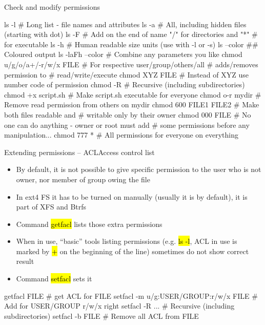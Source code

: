 \documentclass[compress, ucs, xelatex, 11pt, xcolor=svgnames,
  hyperref={
    bookmarks=true,
    unicode=true,
    colorlinks=true,
    pdftitle={Linux, command line and MetaCentrum},
    plainpages=false,
    pdfauthor={Vojtech Zeisek},
    pdfsubject={Course about use of Linux command line, writing shell scripts and using MetaCentrum of CESNET},
    pdfcreator={XeLaTeX},
    pdfkeywords={Linux, GNU, BASH, shell, command line, MetaCentrum},
    linkcolor=Red,
    anchorcolor=Blue,
    citecolor=Purple,
    filecolor=DodgerBlue,
    menucolor=DarkOrchid,
    urlcolor=DeepSkyBlue,
    pdftex},
  url={hyphens, lowtilde} %
  ]{beamer}
\renewcommand{\texttt}[1]{\hl{\ttfamily #1}}
\begin{document}
\begin{frame}[fragile]{Check and modify permissions}
  \begin{bashcode}
    ls -l # Long list - file names and attributes
    ls -a # All, including hidden files (starting with dot)
    ls -F # Add on the end of name "/" for directories and "*"
          # for executable
    ls -h # Human readable size units (use with -l or -s)
    ls --color ## Coloured output
    ls -laFh --color # Combine any parameters you like
    chmod u/g/o/a+/-r/w/x FILE # For respective user/group/others/all
                               # adds/removes permission to
                               # read/write/execute
    chmod XYZ FILE # Instead of XYZ use number code of permission
    chmod -R # Recursive (including subdirectories)
    chmod +x script.sh # Make script.sh executable for everyone
    chmod o-r mydir # Remove read permission from others on mydir
    chmod 600 FILE1 FILE2 # Make both files readable and
                          # writable only by their owner
    chmod 000 FILE # No one can do anything - owner or root must add
                   # some permissions before any manipulation...
    chmod 777 * # All permissions for everyone on everything
  \end{bashcode}
\end{frame}

\begin{frame}[fragile, label=acl]{Extending permissions -- ACL}{Access control list}
\begin{itemize}
  \item By default, it is not possible to give specific permission to the user who is not owner, nor member of group owing the file
  \item In ext4 FS it has to be turned on manually (usually it is by default), it is part of XFS and Btrfs
  \item Command \texttt{getfacl} lists those extra permissions
  \item When in use, ``basic'' tools listing permissions (e.g. \texttt{ls -l}, ACL in use is marked by \texttt{+} on the beginning of the line) sometimes do not show correct result
  \item Command \texttt{setfacl} sets it
\end{itemize}
  \begin{bashcode}
    getfacl FILE # get ACL for FILE
    setfacl -m u/g:USER/GROUP:r/w/x FILE # Add for USER/GROUP r/w/x right
    setfacl -R ... # Recursive (including subdirectories)
    setfacl -b FILE # Remove all ACL from FILE
  \end{bashcode}
\end{frame}
\end{document}

